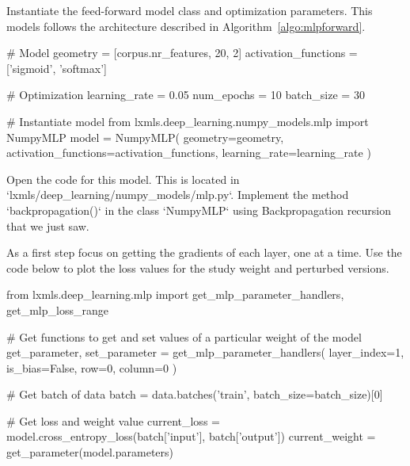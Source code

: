 \begin{exercise}
Instantiate the feed-forward model class and optimization parameters. This models follows the architecture described in Algorithm~\ref{algo:mlpforward}.
\begin{python}
# Model
geometry = [corpus.nr_features, 20, 2]
activation_functions = ['sigmoid', 'softmax']

# Optimization
learning_rate = 0.05
num_epochs = 10
batch_size = 30

# Instantiate model
from lxmls.deep_learning.numpy_models.mlp import NumpyMLP
model = NumpyMLP(
    geometry=geometry,
    activation_functions=activation_functions,
    learning_rate=learning_rate
)
\end{python}
Open the code for this model. This is located in `lxmls/deep\_learning/numpy\_models/mlp.py`. Implement the method `backpropagation()` in the class
`NumpyMLP` using Backpropagation recursion that we just saw.

As a first step focus on getting the gradients of each layer, one at a time.
Use the code below to plot the loss values for the study weight and perturbed
versions. 
\begin{python}
from lxmls.deep_learning.mlp import get_mlp_parameter_handlers, get_mlp_loss_range

# Get functions to get and set values of a particular weight of the model
get_parameter, set_parameter = get_mlp_parameter_handlers(
    layer_index=1,
    is_bias=False,
    row=0, 
    column=0
)

# Get batch of data
batch = data.batches('train', batch_size=batch_size)[0]

# Get loss and weight value
current_loss = model.cross_entropy_loss(batch['input'], batch['output'])
current_weight = get_parameter(model.parameters)


\end{python}
\end{exercise}
